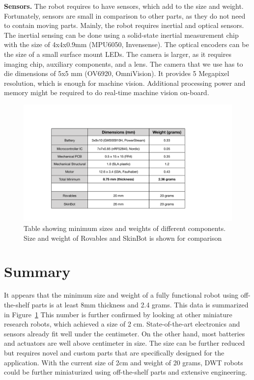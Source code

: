 \textbf{Sensors.}
The robot requires to have sensors, which add to the size and weight. Fortunately, sensors are small in comparison to other parts, as they do not need to contain moving parts. Mainly, the robot requires inertial and optical sensors. The inertial sensing can be done using a solid-state inertial measurement chip with the size of 4x4x0.9mm (MPU6050, Invensense). The optical encoders can be the size of a small surface mount LEDs. The camera is larger, as it requires imaging chip, auxiliary components, and a lens. The camera that we use has to die dimensions of  5x5 mm (OV6920, OmniVision). It provides 5 Megapixel resolution, which is enough for machine vision. Additional processing power and memory might be required to do real-time machine vision on-board. 
\begin{figure}[!ht]
\centering
\includegraphics[width=14.0cm]{pictures/chapter6/pic_comparison_sizes_robots.pdf}
\caption{Table showing minimum sizes and weights of different components. Size and weight of Rovables and SkinBot is shown for comparison }
\label{fig:size_weight_min}
\end{figure}

\section{Summary}
It appears that the minimum size and weight of a fully functional robot using off-the-shelf parts is at least 8mm thickness and 2.4 grams. This data is summarized in Figure~\ref{fig:size_weight_min} This number is further confirmed by looking at other miniature research robots, which achieved a size of 2 cm. State-of-the-art electronics and sensors already fit well under the centimeter. On the other hand, most batteries and actuators are well above centimeter in size. The size can be further reduced but requires novel and custom parts that are specifically designed for the application. With the current size of 2cm and weight of 20 grams, DWT robots could be further miniaturized using off-the-shelf parts and extensive engineering. 



